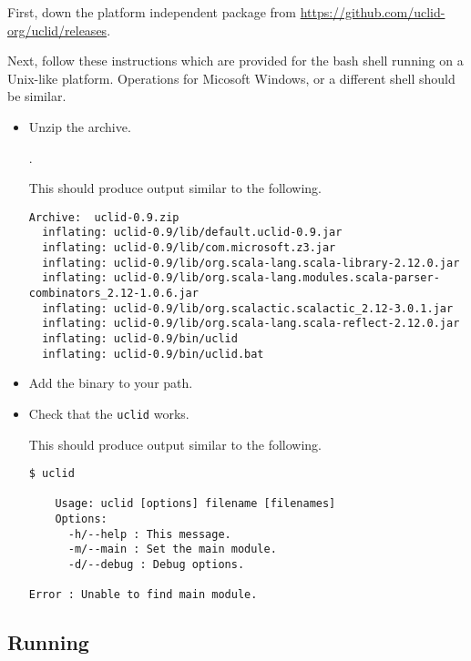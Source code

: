 First, down the platform independent package from \url{https://github.com/uclid-org/uclid/releases}.

Next, follow these instructions which are provided for the bash shell running on a Unix-like platform. Operations for Micosoft Windows, or a different shell should be similar.

\begin{itemize}
  \item Unzip the archive.

  .

  This should produce output similar to the following.
\begin{verbatim}
Archive:  uclid-0.9.zip
  inflating: uclid-0.9/lib/default.uclid-0.9.jar  
  inflating: uclid-0.9/lib/com.microsoft.z3.jar  
  inflating: uclid-0.9/lib/org.scala-lang.scala-library-2.12.0.jar  
  inflating: uclid-0.9/lib/org.scala-lang.modules.scala-parser-combinators_2.12-1.0.6.jar  
  inflating: uclid-0.9/lib/org.scalactic.scalactic_2.12-3.0.1.jar  
  inflating: uclid-0.9/lib/org.scala-lang.scala-reflect-2.12.0.jar  
  inflating: uclid-0.9/bin/uclid     
  inflating: uclid-0.9/bin/uclid.bat  
\end{verbatim}


  \item Add the  binary to your path.


  \item Check that the \texttt{uclid} works.


  This should produce output similar to the following.
\begin{verbatim}
$ uclid

    Usage: uclid [options] filename [filenames]
    Options:
      -h/--help : This message.
      -m/--main : Set the main module.
      -d/--debug : Debug options.
  
Error : Unable to find main module.
\end{verbatim}
\end{itemize}

\subsection{Running \uclid{}}

